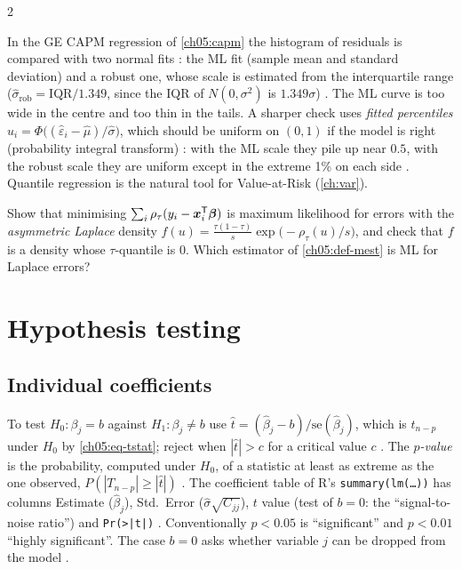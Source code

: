 \begin{paracol}{2}
\begin{finance}
In the GE CAPM regression of \cref{ch05:capm} the histogram of residuals is compared with two normal fits
: the ML fit (sample mean and standard deviation) and a robust one, whose scale is
estimated from the interquartile range ($\hat\sigma_{\text{rob}}=\mathrm{IQR}/1.349$, since the IQR of $N(0,\sigma^2)$ is
$1.349\sigma$) . The ML curve is too wide in the centre and too thin in the tails. A sharper
check uses \emph{fitted percentiles} $u_i=\Phi\bigl((\hat\varepsilon_i-\hat\mu)/\hat\sigma\bigr)$, which should be uniform on $(0,1)$ if the
model is right (probability integral transform) : with the ML scale they pile up near
$0.5$, with the robust scale they are uniform except in the extreme 1\% on each side
. Quantile regression is the natural tool for Value-at-Risk (\cref{ch:var}).
\end{finance}

\begin{exercise}
Show that minimising $\sum_i\rho_\tau(y_i-\bm x_i^{\mathsf T}\bm\beta)$ is maximum likelihood for errors with the \emph{asymmetric Laplace} density
$f(u)=\frac{\tau(1-\tau)}{s}\exp\bigl(-\rho_\tau(u)/s\bigr)$, and check that $f$ is a density whose $\tau$-quantile is $0$. Which estimator of
\cref{ch05:def-mest} is ML for Laplace errors?
\end{exercise}

\section{Hypothesis testing}\label{ch05:sec-tests}

\subsection{Individual coefficients}
To test $H_0:\beta_j=b$ against $H_1:\beta_j\ne b$ use $\hat t=(\hat\beta_j-b)/\mathrm{se}(\hat\beta_j)$, which is $t_{n-p}$
under $H_0$ by \eqref{ch05:eq-tstat}; reject when $|\hat t|>c$ for a critical value $c$ . The
\emph{$p$-value} is the probability, computed under $H_0$, of a statistic at least as extreme as the one observed,
$P(|T_{n-p}|\ge|\hat t|)$ . The coefficient table of R's \texttt{summary(lm(\dots))} has columns
Estimate ($\hat\beta_j$), Std.\ Error ($\hat\sigma\sqrt{C_{jj}}$), $t$ value (test of $b=0$: the ``signal-to-noise
ratio'') and \texttt{Pr(>|t|)} . Conventionally $p<0.05$ is ``significant'' and $p<0.01$
``highly significant''. The case $b=0$ asks whether variable $j$ can be dropped from the model
.


\end{paracol}
